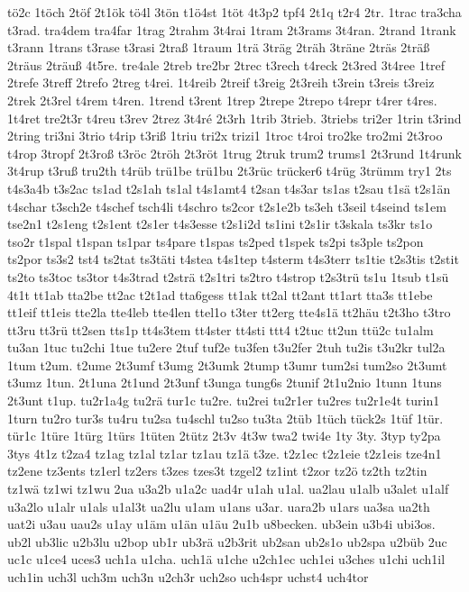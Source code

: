 {tö2c
1töch
2töf
2t1ök
tö4l
3tön
t1ö4st
1töt
4t3p2
tpf4
2t1q
t2r4
2tr.
1trac
tra3cha
t3rad.
tra4dem
tra4far
1trag
2trahm
3t4rai
1tram
2t3rams
3t4ran.
2trand
1trank
t3rann
1trans
t3rase
t3rasi
2traß
1traum
1trä
3träg
2träh
3träne
2träs
2träß
2träus
2träuß
4t5re.
tre4ale
2treb
tre2br
2trec
t3rech
t4reck
2t3red
3t4ree
1tref
2trefe
3treff
2trefo
2treg
t4rei.
1t4reib
2treif
t3reig
2t3reih
t3rein
t3reis
t3reiz
2trek
2t3rel
t4rem
t4ren.
1trend
t3rent
1trep
2trepe
2trepo
t4repr
t4rer
t4res.
1t4ret
tre2t3r
t4reu
t3rev
2trez
3t4ré
2t3rh
1trib
3trieb.
3triebs
tri2er
1trin
t3rind
2tring
tri3ni
3trio
t4rip
t3riß
1triu
tri2x
trizi1
1troc
t4roi
tro2ke
tro2mi
2t3roo
t4rop
3tropf
2t3roß
t3röc
2tröh
2t3röt
1trug
2truk
trum2
trums1
2t3rund
1t4runk
3t4rup
t3ruß
tru2th
t4rüb
trü1be
trü1bu
2t3rüc
trücker6
t4rüg
3trümm
try1
2ts
t4s3a4b
t3s2ac
ts1ad
t2s1ah
ts1al
t4s1amt4
t2san
t4s3ar
ts1as
t2sau
t1sä
t2s1än
t4schar
t3sch2e
t4schef
tsch4li
t4schro
ts2cor
t2s1e2b
ts3eh
t3seil
t4seind
ts1em
tse2n1
t2s1eng
t2s1ent
t2s1er
t4s3esse
t2s1i2d
ts1ini
t2s1ir
t3skala
ts3kr
ts1o
tso2r
t1spal
t1span
ts1par
ts4pare
t1spas
ts2ped
t1spek
ts2pi
ts3ple
ts2pon
ts2por
ts3s2
tst4
ts2tat
ts3täti
t4stea
t4s1tep
t4sterm
t4s3terr
ts1tie
t2s3tis
t2stit
ts2to
ts3toc
ts3tor
t4s3trad
t2strä
t2s1tri
ts2tro
t4strop
t2s3trü
ts1u
1tsub
t1sü
4t1t
tt1ab
tta2be
tt2ac
t2t1ad
tta6gess
tt1ak
tt2al
tt2ant
tt1art
tta3s
tt1ebe
tt1eif
tt1eis
tte2la
tte4leb
tte4len
ttel1o
t3ter
tt2erg
tte4s1ä
tt2häu
t2t3ho
t3tro
tt3ru
tt3rü
tt2sen
tts1p
tt4s3tem
tt4ster
tt4sti
ttt4
t2tuc
tt2un
ttü2c
tu1alm
tu3an
1tuc
tu2chi
1tue
tu2ere
2tuf
tuf2e
tu3fen
t3u2fer
2tuh
tu2is
t3u2kr
tul2a
1tum
t2um.
t2ume
2t3umf
t3umg
2t3umk
2tump
t3umr
tum2si
tum2so
2t3umt
t3umz
1tun.
2t1una
2t1und
2t3unf
t3unga
tung6s
2tunif
2t1u2nio
1tunn
1tuns
2t3unt
t1up.
tu2r1a4g
tu2rä
tur1c
tu2re.
tu2rei
tu2r1er
tu2res
tu2r1e4t
turin1
1turn
tu2ro
tur3s
tu4ru
tu2sa
tu4schl
tu2so
tu3ta
2tüb
1tüch
tück2s
1tüf
1tür.
tür1c
1türe
1türg
1türs
1tüten
2tütz
2t3v
4t3w
twa2
twi4e
1ty
3ty.
3typ
ty2pa
3tys
4t1z
t2za4
tz1ag
tz1al
tz1ar
tz1au
tz1ä
t3ze.
t2z1ec
t2z1eie
t2z1eis
tze4n1
tz2ene
tz3ents
tz1erl
tz2ers
t3zes
tzes3t
tzgel2
tz1int
t2zor
tz2ö
tz2th
tz2tin
tz1wä
tz1wi
tz1wu
2ua
u3a2b
u1a2c
uad4r
u1ah
u1al.
ua2lau
u1alb
u3alet
u1alf
u3a2lo
u1alr
u1als
u1al3t
ua2lu
u1am
u1ans
u3ar.
uara2b
u1ars
ua3sa
ua2th
uat2i
u3au
uau2s
u1ay
u1äm
u1än
u1äu
2u1b
u8becken.
ub3ein
u3b4i
ubi3os.
ub2l
ub3lic
u2b3lu
u2bop
ub1r
ub3rä
u2b3rit
ub2san
ub2s1o
ub2spa
u2büb
2uc
uc1c
u1ce4
uces3
uch1a
u1cha.
uch1ä
u1che
u2ch1ec
uch1ei
u3ches
u1chi
uch1il
uch1in
uch3l
uch3m
uch3n
u2ch3r
uch2so
uch4spr
uchst4
uch4tor
}
